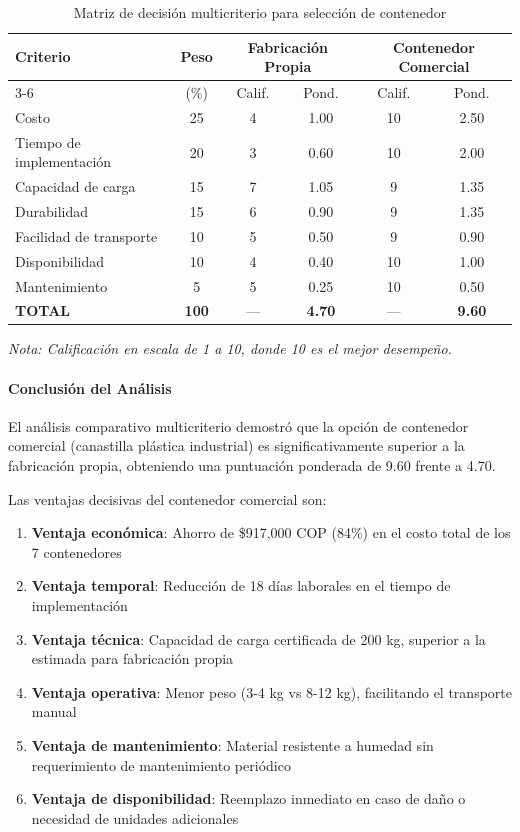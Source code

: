 \begin{table}[H]
\centering
\caption{Matriz de decisión multicriterio para selección de contenedor}
\label{tab:matriz_decision}
\begin{tabular}{|l|c|c|c|c|c|}
\hline
\textbf{Criterio} & \textbf{Peso} & \multicolumn{2}{c|}{\textbf{Fabricación Propia}} & \multicolumn{2}{c|}{\textbf{Contenedor Comercial}} \\
\cline{3-6}
 & (\%) & Calif. & Pond. & Calif. & Pond. \\
\hline
Costo & 25 & 4 & 1.00 & 10 & 2.50 \\
Tiempo de implementación & 20 & 3 & 0.60 & 10 & 2.00 \\
Capacidad de carga & 15 & 7 & 1.05 & 9 & 1.35 \\
Durabilidad & 15 & 6 & 0.90 & 9 & 1.35 \\
Facilidad de transporte & 10 & 5 & 0.50 & 9 & 0.90 \\
Disponibilidad & 10 & 4 & 0.40 & 10 & 1.00 \\
Mantenimiento & 5 & 5 & 0.25 & 10 & 0.50 \\
\hline
\textbf{TOTAL} & \textbf{100} & --- & \textbf{4.70} & --- & \textbf{9.60} \\
\hline
\end{tabular}
\end{table}

\textit{Nota: Calificación en escala de 1 a 10, donde 10 es el mejor desempeño.}

\paragraph{Conclusión del Análisis}

El análisis comparativo multicriterio demostró que la opción de contenedor comercial (canastilla plástica industrial) es significativamente superior a la fabricación propia, obteniendo una puntuación ponderada de 9.60 frente a 4.70.

Las ventajas decisivas del contenedor comercial son:

\begin{enumerate}
    \item \textbf{Ventaja económica}: Ahorro de \$917,000 COP (84\%) en el costo total de los 7 contenedores
    \item \textbf{Ventaja temporal}: Reducción de 18 días laborales en el tiempo de implementación
    \item \textbf{Ventaja técnica}: Capacidad de carga certificada de 200 kg, superior a la estimada para fabricación propia
    \item \textbf{Ventaja operativa}: Menor peso (3-4 kg vs 8-12 kg), facilitando el transporte manual
    \item \textbf{Ventaja de mantenimiento}: Material resistente a humedad sin requerimiento de mantenimiento periódico
    \item \textbf{Ventaja de disponibilidad}: Reemplazo inmediato en caso de daño o necesidad de unidades adicionales
\end{enumerate}


